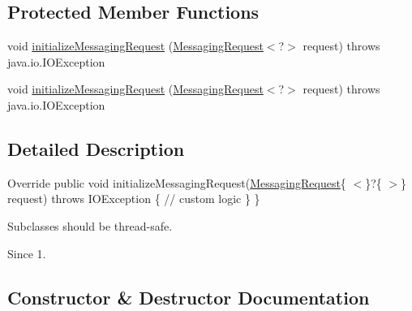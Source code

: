 \subsection*{Protected Member Functions}
\begin{DoxyCompactItemize}
\item 
void \hyperlink{classcom_1_1example_1_1lusifer_1_1myapplication_1_1backend_1_1messaging_1_1_messaging_request_initializer_a597f3f87016ec81927193e0d61b10a02}{initialize\+Messaging\+Request} (\hyperlink{classcom_1_1example_1_1lusifer_1_1myapplication_1_1backend_1_1messaging_1_1_messaging_request}{Messaging\+Request}$<$?$>$ request)  throws java.\+io.\+I\+O\+Exception 
\item 
void \hyperlink{classcom_1_1example_1_1lusifer_1_1myapplication_1_1backend_1_1messaging_1_1_messaging_request_initializer_a597f3f87016ec81927193e0d61b10a02}{initialize\+Messaging\+Request} (\hyperlink{classcom_1_1example_1_1lusifer_1_1myapplication_1_1backend_1_1messaging_1_1_messaging_request}{Messaging\+Request}$<$?$>$ request)  throws java.\+io.\+I\+O\+Exception 
\end{DoxyCompactItemize}


\subsection{Detailed Description}
Override public void initialize\+Messaging\+Request(\hyperlink{classcom_1_1example_1_1lusifer_1_1myapplication_1_1backend_1_1messaging_1_1_messaging_request}{Messaging\+Request}\{ $<$\}?\{ $>$\} request) throws I\+O\+Exception \{ // custom logic \} \} 

Subclasses should be thread-\/safe. 

\begin{DoxySince}{Since}
1. 
\end{DoxySince}


\subsection{Constructor \& Destructor Documentation}
\hypertarget{classcom_1_1example_1_1lusifer_1_1myapplication_1_1backend_1_1messaging_1_1_messaging_request_initializer_ad7db0db950cd64697d07c47a5f17367e}{}
